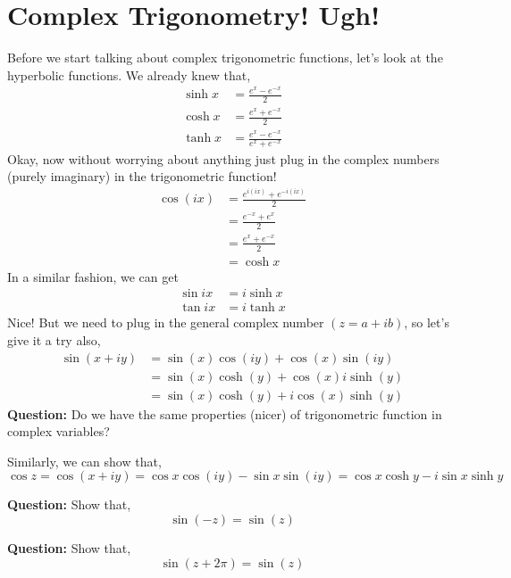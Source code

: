 \section{Complex Trigonometry! Ugh!}
Before we start talking about complex trigonometric functions, let's look at the hyperbolic functions. We already knew that, 
\begin{align*}
    \sinh{x}&=\frac{e^x-e^{-x}}{2}\\
    \cosh{x}&=\frac{e^x+e^{-x}}{2}\\
    \tanh{x}&=\frac{e^x-e^{-x}}{e^x+e^{-x}}
\end{align*}
Okay, now without worrying about anything just plug in the complex numbers (purely imaginary) in the trigonometric function! 
\begin{align*}
    \cos(ix)&=\frac{e^{i(ix)}+e^{-i(ix)}}{2}\\
    &= \frac{e^{-x}+e^{x}}{2}\\
    &= \frac{e^x+e^{-x}}{2}\\
    &= \cosh{x}
\end{align*}
In a similar fashion, we can get
\begin{align*}
    \sin{ix}&=i\sinh{x}\\
    \tan{ix}&=i\tanh{x}
\end{align*}
Nice! But we need to plug in the general complex number $(z=a+ib)$, so let's give it a try also,
\begin{align*}
    \sin(x+iy)&=\sin(x)\cos(iy)+\cos(x)\sin(iy)\\
    &= \sin(x)\cosh(y)+\cos(x)i\sinh(y)\\
    &= \sin(x)\cosh(y)+i\cos(x)\sinh(y)
\end{align*}
\textbf{Question:} Do we have the same properties (nicer) of trigonometric function in complex variables?\\
\begin{example}
    Similarly, we can show that, $$\cos{z}=\cos(x+iy)=\cos x\cos(iy)-\sin x\sin(iy)=\cos x\cosh y-i\sin x\sinh y$$
\end{example}
\begin{example}
    \textbf{Question:} Show that, $$\sin(-z)=\sin(z)$$
\end{example}
\begin{example}
    \textbf{Question:} Show that, $$\sin(z+2\pi)=\sin(z)$$
\end{example}
